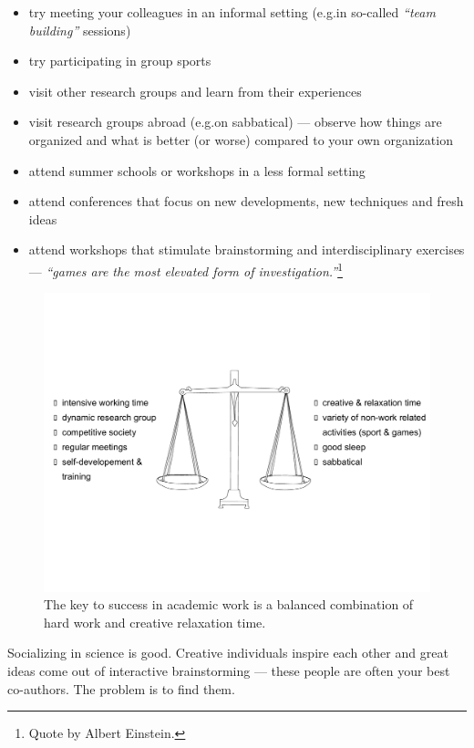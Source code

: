 \documentclass[graybox,envcountchap,sectrefs,UStrade]{svmono}
\begin{document}
\begin{itemize}
  \item try meeting your colleagues in an informal setting (e.g.\@ in so-called \emph{``team building''} sessions)
  \item try participating in group sports
  \item visit other research groups and learn from their experiences
  \item visit research groups abroad (e.g.\@ on sabbatical) --- observe how things are organized and what is better (or worse) compared to your own organization
  \item attend summer schools or workshops in a less formal setting
  \item attend conferences that focus on new developments, new techniques and fresh ideas
  \item attend workshops that stimulate brainstorming and interdisciplinary exercises --- \emph{``games are the most elevated form of investigation.''}\footnote{Quote by Albert Einstein.}
\end{itemize}

\begin{figure}[!hbt]
 \begin{center}
  \includegraphics[width=\textwidth]{Fig_libra_antistress.pdf}
 \caption{The key to success in academic work is a balanced combination of hard work and creative relaxation time.} \label{Fig:libra_antistress}
 \end{center}
\end{figure}

Socializing in science is good. Creative individuals inspire each other and great ideas come out of interactive brainstorming --- these people are often your best co-authors. The problem is to find them.\par
\end{document}
